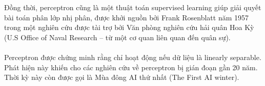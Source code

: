 \documentclass{report}
\newcommand\tab[1][1.25cm]{\hspace*{#1}}
\begin{document}
                    \fontsize{13}{10}\selectfont
                        Đồng thời, perceptron cũng là một thuật toán supervised learning giúp giải quyết bài toán phân lớp nhị phân, được khởi nguồn bởi Frank Rosenblatt năm 1957 trong một nghiên cứu được tài trợ bởi Văn phòng nghiên cứu hải quân Hoa Kỳ (U.S Office of Naval Research – từ một cơ quan liên quan đến quân sự).
                    \vspace{0.1cm}\paragraph{}\tab[0.5cm]\fontsize{13}{10}\selectfont
                        Perceptron được chứng minh rằng chỉ hoạt động nếu dữ liệu là linearly separable. Phát hiện này khiến cho các nghiên cứu về perceptron bị gián đoạn gần 20 năm. Thời kỳ này còn được gọi là Mùa đông AI thứ nhất (The First AI winter).\paragraph{}\leavevmode\\\leavevmode\\

            \fontsize{15}{10}\selectfont
\end{document}
